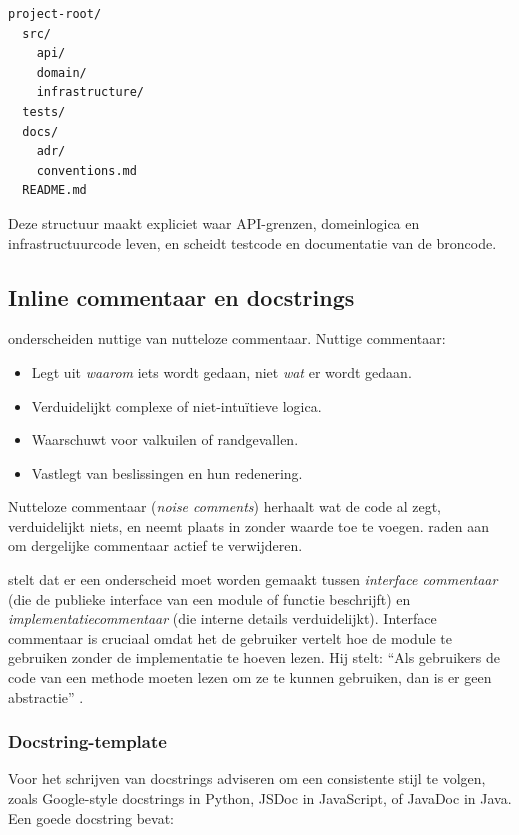 \begin{verbatim}
project-root/
  src/
    api/
    domain/
    infrastructure/
  tests/
  docs/
    adr/
    conventions.md
  README.md
\end{verbatim}

Deze structuur maakt expliciet waar API-grenzen, domeinlogica en infrastructuurcode leven, en scheidt testcode en documentatie van de broncode.

\subsection{Inline commentaar en docstrings}
\textcite{boswell2011readablecode} onderscheiden nuttige van nutteloze commentaar. Nuttige commentaar:

\begin{itemize}
    \item Legt uit \textit{waarom} iets wordt gedaan, niet \textit{wat} er wordt gedaan.
    \item Verduidelijkt complexe of niet-intuïtieve logica.
    \item Waarschuwt voor valkuilen of randgevallen.
    \item Vastlegt van beslissingen en hun redenering.
\end{itemize}

Nutteloze commentaar (\textit{noise comments}) herhaalt wat de code al zegt, verduidelijkt niets, en neemt plaats in zonder waarde toe te voegen. \textcite{boswell2011readablecode} raden aan om dergelijke commentaar actief te verwijderen.

\textcite{ousterhout2018philosophy} stelt dat er een onderscheid moet worden gemaakt tussen \textit{interface commentaar} (die de publieke interface van een module of functie beschrijft) en \textit{implementatiecommentaar} (die interne details verduidelijkt). Interface commentaar is cruciaal omdat het de gebruiker vertelt hoe de module te gebruiken zonder de implementatie te hoeven lezen. Hij stelt: ``Als gebruikers de code van een methode moeten lezen om ze te kunnen gebruiken, dan is er geen abstractie'' \autocite{ousterhout2018philosophy}.

\subsubsection{Docstring-template}
Voor het schrijven van docstrings adviseren \textcite{bhatti2021docsdevelopers} om een consistente stijl te volgen, zoals Google-style docstrings in Python, JSDoc in JavaScript, of JavaDoc in Java. Een goede docstring bevat:

